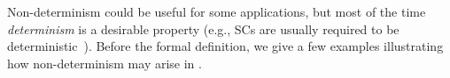 Non-determinism could be useful for some applications, %
but most of the time \emph{determinism} is a desirable property (e.g.,
SCs are usually required to be
deterministic~\cite{ethereum_white_paper}).
%
Before the formal definition, we give a few examples illustrating how
non-determinism may arise in \modelnames.

